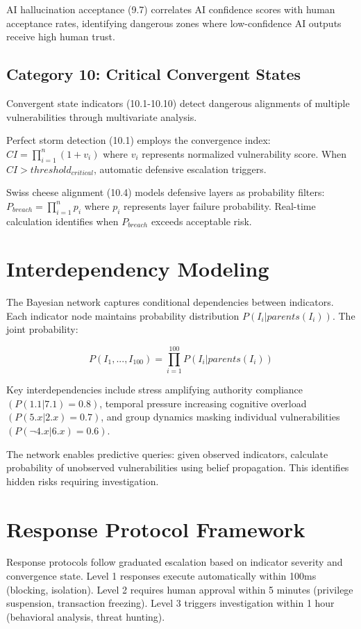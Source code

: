 \documentclass[10pt, twocolumn]{article}
\begin{document}
AI hallucination acceptance (9.7) correlates AI confidence scores with human acceptance rates, identifying dangerous zones where low-confidence AI outputs receive high human trust.

\subsection{Category 10: Critical Convergent States}

Convergent state indicators (10.1-10.10) detect dangerous alignments of multiple vulnerabilities through multivariate analysis.

Perfect storm detection (10.1) employs the convergence index: $CI = \prod_{i=1}^{n} (1 + v_i)$ where $v_i$ represents normalized vulnerability score. When $CI > threshold_{critical}$, automatic defensive escalation triggers.

Swiss cheese alignment (10.4) models defensive layers as probability filters: $P_{breach} = \prod_{i=1}^{n} p_i$ where $p_i$ represents layer failure probability. Real-time calculation identifies when $P_{breach}$ exceeds acceptable risk.

\section{Interdependency Modeling}

The Bayesian network captures conditional dependencies between indicators. Each indicator node maintains probability distribution $P(I_i | parents(I_i))$. The joint probability:

$$P(I_1, ..., I_{100}) = \prod_{i=1}^{100} P(I_i | parents(I_i))$$

Key interdependencies include stress amplifying authority compliance $(P(1.1|7.1) = 0.8)$, temporal pressure increasing cognitive overload $(P(5.x|2.x) = 0.7)$, and group dynamics masking individual vulnerabilities $(P(\neg 4.x|6.x) = 0.6)$.

The network enables predictive queries: given observed indicators, calculate probability of unobserved vulnerabilities using belief propagation. This identifies hidden risks requiring investigation.

\section{Response Protocol Framework}

Response protocols follow graduated escalation based on indicator severity and convergence state. Level 1 responses execute automatically within 100ms (blocking, isolation). Level 2 requires human approval within 5 minutes (privilege suspension, transaction freezing). Level 3 triggers investigation within 1 hour (behavioral analysis, threat hunting).
\end{document}
